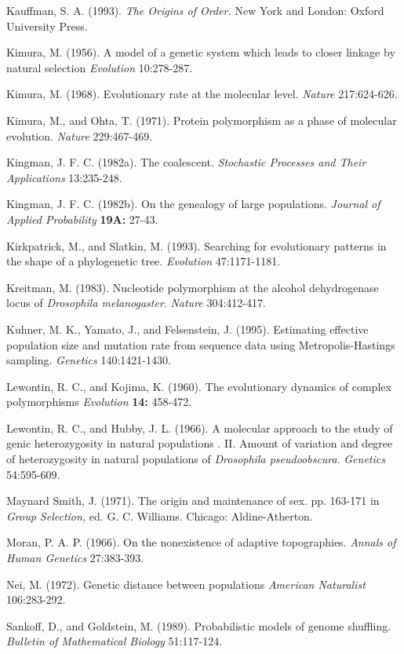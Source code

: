 \documentclass[12pt]{article}
\begin{document}
{Kauffman, S. A.  (1993).  {\it The Origins of Order.}  New York and London: Oxford University Press.

Kimura, M.  (1956).
A model of a genetic system which leads to closer linkage by natural selection
{\it Evolution}  10:278-287.

Kimura, M. (1968).  Evolutionary rate at the molecular level.
{\it Nature}  217:624-626.

Kimura, M., and Ohta, T.  (1971).  Protein polymorphism as a phase of molecular evolution.
{\it Nature}  229:467-469.

Kingman, J. F. C. (1982a).  The coalescent.  {\it Stochastic Processes and Their
Applications}   13:235-248.

Kingman, J. F. C. (1982b).  On the genealogy of large populations.  {\it
Journal of Applied Probability}  {\bf 19A:} 27-43.

Kirkpatrick, M., and Slatkin, M.  (1993).  Searching for evolutionary patterns
in the shape of a phylogenetic tree.  {\it Evolution}  47:1171-1181.

Kreitman, M.  (1983).  Nucleotide polymorphism at the alcohol dehydrogenase
locus of
{\it Drosophila melanogaster}.  {\it Nature}  304:412-417.

Kuhner, M. K., Yamato, J., and Felsenstein, J. (1995).
Estimating effective population size and mutation rate from sequence data
using Metropolis-Hastings sampling. {\it Genetics}  140:1421-1430.

Lewontin, R. C., and Kojima, K. (1960).
The evolutionary dynamics of complex polymorphisms {\it Evolution} {\bf 14:}
458-472.

Lewontin, R. C., and Hubby, J. L. (1966).
A molecular approach to the study of genic heterozygosity in natural populations
. II. Amount of variation and degree of heterozygosity in natural populations of
 {\it Drosophila pseudoobscura}.
{\it Genetics}  54:595-609.

Maynard Smith, J.  (1971).  The origin and maintenance of sex.
pp. 163-171 in {\it Group Selection,} ed. G. C. Williams. Chicago: Aldine-Atherton.

Moran, P. A. P.  (1966).  On the nonexistence of adaptive topographies.
{\it Annals of Human Genetics}  27:383-393.

Nei, M. (1972).  Genetic distance between populations
{\it American Naturalist}  106:283-292.

Sankoff, D., and Goldstein, M.  (1989).  Probabilistic models of genome
shuffling.  {\it Bulletin of Mathematical Biology}  51:117-124.

}
\end{document}
